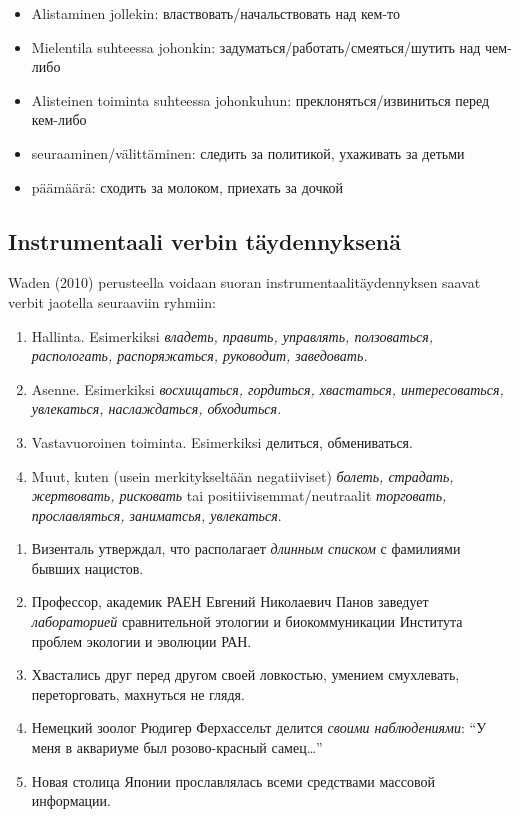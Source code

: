 \documentclass[]{scrreprt}
\providecommand{\tightlist}{%
  \setlength{\itemsep}{0pt}\setlength{\parskip}{0pt}}
\begin{document}
\begin{itemize}
\tightlist
\item
  Alistaminen jollekin: властвовать/начальствовать над кем-то
\item
  Mielentila suhteessa johonkin: задуматься/работать/смеяться/шутить над
  чем-либо
\item
  Alisteinen toiminta suhteessa johonkuhun: преклоняться/извиниться
  перед кем-либо
\item
  seuraaminen/välittäminen: следить за политикой, ухаживать за детьми
\item
  päämäärä: сходить за молоком, приехать за дочкой
\end{itemize}

\subsection{Instrumentaali verbin
täydennyksenä}\label{instrumentaali-verbin-tuxe4ydennyksenuxe4}

Waden (2010) perusteella voidaan suoran instrumentaalitäydennyksen
saavat verbit jaotella seuraaviin ryhmiin:

\begin{enumerate}
\def\labelenumi{\arabic{enumi}.}
\tightlist
\item
  Hallinta. Esimerkiksi \emph{владеть, править, управлять, ползоваться,
  распологать, распоряжаться, руководит, заведовать.}
\item
  Asenne. Esimerkiksi \emph{восхищаться, гордиться, хвастаться,
  интересоваться, увлекаться, наслаждаться, обходиться.}
\item
  Vastavuoroinen toiminta. Esimerkiksi делиться, обмениваться.
\item
  Muut, kuten (usein merkitykseltään negatiiviset) \emph{болеть,
  страдать, жертвовать, рисковать} tai positiivisemmat/neutraalit
  \emph{торговать, прославляться, заниматсья, увлекаться}.
\end{enumerate}

\begin{enumerate}
\def\labelenumi{(\arabic{enumi})}
\setcounter{enumi}{148}
\tightlist
\item
  Визенталь утверждал, что располагает \emph{длинным списком} с
  фамилиями бывших нацистов.
\item
  Профессор, академик РАЕН Евгений Николаевич Панов заведует
  \emph{лабораторией} сравнительной этологии и биокоммуникации Института
  проблем экологии и эволюции РАН.
\item
  Хвастались друг перед другом своей ловкостью, умением смухлевать,
  переторговать, махнуться не глядя.
\item
  Немецкий зоолог Рюдигер Ферхассельт делится \emph{своими
  наблюдениями}: ``У меня в аквариуме был розово-красный самец\ldots{}''
\item
  Новая столица Японии прославлялась всеми средствами массовой
  информации.
\end{enumerate}
\end{document}
